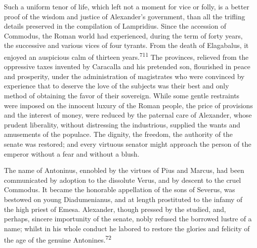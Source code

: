 

Such a uniform tenor of life, which left not a moment for vice or
folly, is a better proof of the wisdom and justice of Alexander’s
government, than all the trifling details preserved in the
compilation of Lampridius. Since the accession of Commodus, the
Roman world had experienced, during the term of forty years, the
successive and various vices of four tyrants. From the death of
Elagabalus, it enjoyed an auspicious calm of thirteen years.\textsuperscript{711}
The provinces, relieved from the oppressive taxes invented by
Caracalla and his pretended son, flourished in peace and
prosperity, under the administration of magistrates who were
convinced by experience that to deserve the love of the subjects
was their best and only method of obtaining the favor of their
sovereign. While some gentle restraints were imposed on the
innocent luxury of the Roman people, the price of provisions and
the interest of money, were reduced by the paternal care of
Alexander, whose prudent liberality, without distressing the
industrious, supplied the wants and amusements of the populace.
The dignity, the freedom, the authority of the senate was
restored; and every virtuous senator might approach the person of
the emperor without a fear and without a blush.


The name of Antoninus, ennobled by the virtues of Pius and
Marcus, had been communicated by adoption to the dissolute Verus,
and by descent to the cruel Commodus. It became the honorable
appellation of the sons of Severus, was bestowed on young
Diadumenianus, and at length prostituted to the infamy of the
high priest of Emesa. Alexander, though pressed by the studied,
and, perhaps, sincere importunity of the senate, nobly refused
the borrowed lustre of a name; whilst in his whole conduct he
labored to restore the glories and felicity of the age of the
genuine Antonines.\textsuperscript{72}


